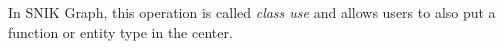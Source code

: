 \documentclass{IOS-Book-Article}     %
\begin{document}

In SNIK Graph, this operation is called \emph{class use} and allows users to also put a function or entity type in the center.

\end{document}
